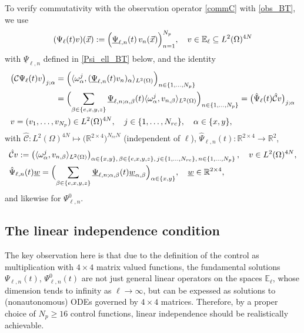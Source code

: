 \documentclass[12pt]{article}
\newcommand\ul[1]{\underline{#1}}
\newcommand\ellnew{\ell}
\newcommand\coilsens{\omega}
\newcommand\vecr{\vec{x}}
\newcommand\ulPsi{\underline{\Psi}}
\newcommand\Ncont{N_p}
\newcommand\Ncoil{N_{rc}}
\begin{document}
To verify commutativity with the observation operator \eqref{commC} with \eqref{obs_BT}, we use 
\[
(\Psi_\ell(t)v)(\vecr) := \Bigl(\ulPsi_{\ell,n}(t)\,v_n(\vecr)\Bigr)_{n=1}^{\Ncont}
,\quad v\in \mathbb{E}_\ell\subseteq L^2(\Omega)^{4N}
\]
with $\ulPsi_{\ell,n}$ defined in \eqref{Psi_ell_BT} below, 
and the identity 
\[
\begin{aligned}
&\bigl(\mathcal{C}\Psi_\ell(t)v\bigr)_{j;\alpha}
=\Bigl(\langle \coilsens^j_\alpha,(\ulPsi_{\ell,n}(t)v_n)_\alpha\rangle_{L^2(\Omega)}\Bigr)_{n\in\{1,\ldots,\Ncont\}}\\
&\phantom{\bigl(\mathcal{C}\Psi_\ell(t)v\bigr)_{j;\alpha}}
=\Bigl(\sum_{\beta\in\{e,x,y,z\}}
\ulPsi_{\ell,n;\alpha,\beta}(t)\langle \coilsens^j_\alpha,v_{n,\beta}\rangle_{L^2(\Omega)}\Bigr)_{n\in\{1,\ldots,\Ncont\}}
=\bigl(\hat{\Psi}_\ell(t)\hat{\mathcal{C}}v\bigr)_{j;\alpha}\\
&v=(v_1,\ldots,v_{\Ncont})\in L^2(\Omega)^{4N},
\quad j\in\{1,\ldots,{\Ncoil}\},\quad \alpha\in\{x,y\},
\end{aligned}
\] 
with $\hat{\mathcal{C}}:L^2(\Omega)^{4N}\mapsto\bigl(\mathbb{R}^{2\times4}\bigr)^{{\Ncoil}N}$ (independent of $\ell$),
$\hat{\Psi}_{\ell,n}(t):\mathbb{R}^{2\times4}\to \mathbb{R}^2$,
\begin{equation}\label{Chat_BT}
\begin{aligned}
&%
\hat{\mathcal{C}} v := 
\left(\langle \coilsens^j_\alpha,v_{n,\beta}\rangle_{L^2(\Omega)}\right)_{\alpha\in\{x,y\},\,\beta\in\{e,x,y,z\},\,j\in\{1,\ldots,{\Ncoil}\},\, n\in\{1,\ldots,\Ncont\}}
,\quad v\in L^2(\Omega)^{4N}, \\
&\hat{\Psi}_{\ell,n}(t) \ul{w} =\Bigl(\sum_{\beta\in\{e,x,y,z\}}
\ulPsi_{\ell,n;\alpha,\beta}(t)\ul{w}_{\alpha,\beta}\Bigr)_{\alpha\in\{x,y\}}, \quad \ul{w}\in \mathbb{R}^{2\times4},
\end{aligned}
\end{equation}
and likewise for $\Psi_{\ell,n}^0$.
\subsection{The linear independence condition}
The key observation here is that due to the definition of the control as multiplication with $4\times 4$ matrix valued functions, the fundamental solutions $\Psi_{\ell,n}(t)$, $\Psi_{\ell,n}^0(t)$ are not just general linear operators on the spaces $\mathbb{E}_\ell$, whose dimension tends to infinity as $\ell\to\infty$, but can be expessed as solutions to (nonautonomous) ODEs governed by $4\times 4$ matrices. 
Therefore, by a proper choice of $\Ncont\geq16$ control functions, linear independence should be realistically achievable. 
\end{document}
